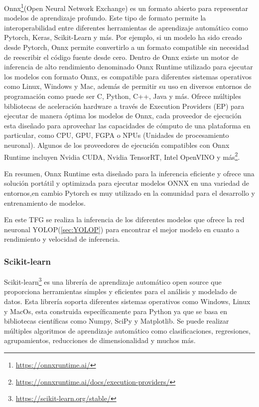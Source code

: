 Onnx\footnote{\url{https://onnxruntime.ai/}}(Open Neural Network Exchange) es un formato abierto para representar modelos de aprendizaje profundo. Este tipo de formato 
permite la interoperabilidad entre diferentes herramientas de aprendizaje automático como Pytorch, Keras, Scikit-Learn y más. Por ejemplo, si un modelo ha sido creado desde Pytorch, Onnx permite convertirlo 
a un formato compatible sin necesidad de reescribir el código fuente desde cero. Dentro de Onnx existe un motor de inferencia de alto rendimiento denominado Onnx Runtime utilizado 
para ejecutar los modelos con formato Onnx, es compatible para diferentes sistemas operativos como Linux, Windows y Mac, además de permitir su uso en diversos entornos de programación
como puede ser C, Python, C++, Java y más. Ofrece múltiples bibliotecas de aceleración hardware a través de Execution Providers (EP) para ejecutar de manera óptima los modelos de Onnx, cada proveedor de ejecución
esta diseñado para aprovechar las capacidades de cómputo de una plataforma en particular, como CPU, GPU, FGPA o NPUs (Unidades de procesamiento neuronal).
Algunos de los proveedores de ejecución compatibles con Onnx Runtime incluyen Nvidia CUDA, Nvidia TensorRT, Intel OpenVINO y más\footnote{\url{https://onnxruntime.ai/docs/execution-providers/}}. \newline

En resumen, Onnx Runtime esta diseñado para la inferencia eficiente y ofrece una solución portátil y optimizada para ejecutar modelos ONNX en una variedad de entornos,en cambio Pytorch es muy utilizado 
en la comunidad para el desarrollo y entrenamiento de modelos. \newline

En este TFG se realiza la inferencia de los diferentes modelos que ofrece la red neuronal YOLOP(\ref{sec:YOLOP}) para encontrar el mejor
modelo en cuanto a rendimiento y velocidad de inferencia. 

\subsubsection{Scikit-learn}
\label{Scikit-learn}

Scikit-learn\footnote{\url{https://scikit-learn.org/stable/}} es una librería de aprendizaje automático open source que proporciona herramientas simples y eficientes para el análisis 
y modelado de datos. Esta librería soporta diferentes sistemas operativos como Windows, Linux y MacOs, esta construida específicamente para Python ya que se basa en bibliotecas
científicas como Numpy, SciPy y Matplotlib. Se puede realizar múltiples algoritmos de aprendizaje automático como clasificaciones, regresiones, agrupamientos, reducciones de dimensionalidad y 
muchos más. 


